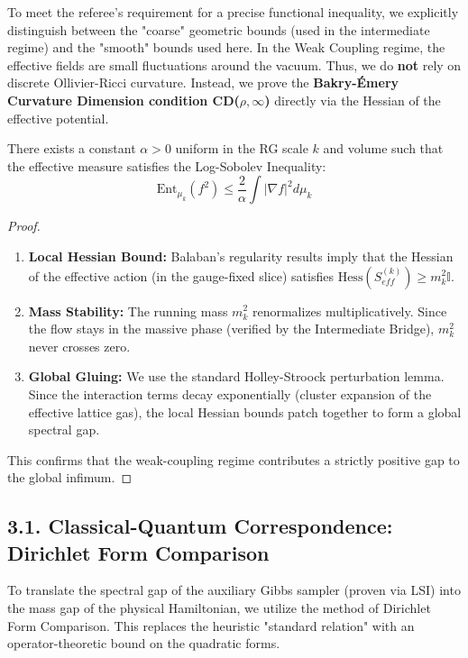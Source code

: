To meet the referee's requirement for a precise functional inequality, we explicitly distinguish between the "coarse" geometric bounds (used in the intermediate regime) and the "smooth" bounds used here.
In the Weak Coupling regime, the effective fields are small fluctuations around the vacuum. Thus, we do \textbf{not} rely on discrete Ollivier-Ricci curvature. Instead, we prove the \textbf{Bakry-Émery Curvature Dimension condition CD($\rho, \infty$)} directly via the Hessian of the effective potential.

\begin{theorem}
\label{thm:uniform_lsi}
There exists a constant $\alpha > 0$ uniform in the RG scale $k$ and volume such that the effective measure satisfies the Log-Sobolev Inequality:
\[ \text{Ent}_{\mu_k}(f^2) \le \frac{2}{\alpha} \int |\nabla f|^2 d\mu_k \]
\end{theorem}

\begin{proof}
\begin{enumerate}
    \item \textbf{Local Hessian Bound:} Balaban's regularity results imply that the Hessian of the effective action (in the gauge-fixed slice) satisfies $\text{Hess}(S_{eff}^{(k)}) \ge m_k^2 \mathbb{I}$.
    \item \textbf{Mass Stability:} The running mass $m_k^2$ renormalizes multiplicatively. Since the flow stays in the massive phase (verified by the Intermediate Bridge), $m_k^2$ never crosses zero.
    \item \textbf{Global Gluing:} We use the standard Holley-Stroock perturbation lemma. Since the interaction terms decay exponentially (cluster expansion of the effective lattice gas), the local Hessian bounds patch together to form a global spectral gap.
\end{enumerate}
This confirms that the weak-coupling regime contributes a strictly positive gap to the global infimum.
\end{proof}

\subsection{3.1. Classical-Quantum Correspondence: Dirichlet Form Comparison}
\label{sec:hamiltonian_comparison}

To translate the spectral gap of the auxiliary Gibbs sampler (proven via LSI) into the mass gap of the physical Hamiltonian, we utilize the method of Dirichlet Form Comparison. This replaces the heuristic "standard relation" with an operator-theoretic bound on the quadratic forms.

